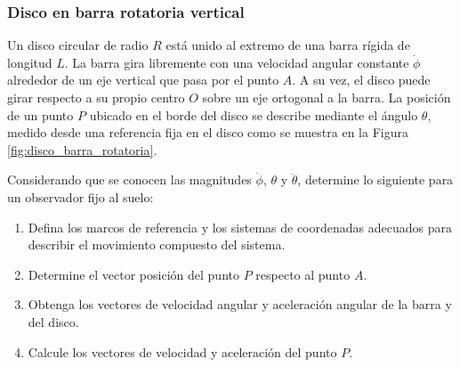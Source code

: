 

\subsubsection{Disco en barra rotatoria vertical}

Un disco circular de radio $R$ está unido al extremo de una barra rígida de longitud $L$. La barra gira libremente con una velocidad angular constante $\dot{\phi}$ alrededor de un eje vertical que pasa por el punto $A$. A su vez, el disco puede girar respecto a su propio centro $O$ sobre un eje ortogonal a la barra. La posición de un punto $P$ ubicado en el borde del disco se describe mediante el ángulo $\theta$, medido desde una referencia fija en el disco como se muestra en la Figura \ref{fig:disco_barra_rotatoria}.

Considerando que se conocen las magnitudes $\dot{\phi}$, $\theta$ y $\ddot{\theta}$, determine lo siguiente para un observador fijo al suelo:

\begin{enumerate}
    \item Defina los marcos de referencia y los sistemas de coordenadas adecuados para describir el movimiento compuesto del sistema.
    \item Determine el vector posición del punto $P$ respecto al punto $A$.
    \item Obtenga los vectores de velocidad angular y aceleración angular de la barra y del disco.
    \item Calcule los vectores de velocidad y aceleración del punto $P$.
\end{enumerate}

